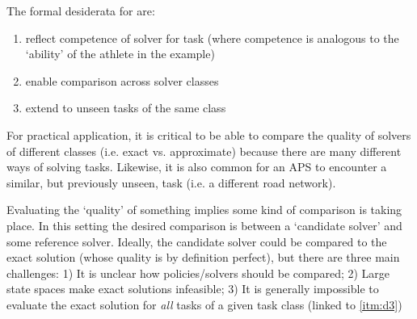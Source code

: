     The formal desiderata for \xQ{} are:
    
    \begin{enumerate}[label=\textbf{D\arabic*}]
        \item reflect competence of solver \solve{} for task \task{} (where competence is analogous to the `ability' of the athlete in the example)\label{itm:d1}
        \item enable comparison across solver classes \label{itm:d2}
        \item extend to unseen tasks of the same class \taskclass \label{itm:d3}
    \end{enumerate}
    
    For practical application, it is critical to be able to compare the quality of solvers of different classes (i.e. exact vs. approximate) because there are many different ways of solving tasks. Likewise, it is also common for an APS to encounter a similar, but previously unseen, task (i.e. a different road network).
    
    Evaluating the `quality' of something implies some kind of comparison is taking place. In this setting the desired comparison is between a `candidate solver' \solve{} and some reference solver. Ideally, the candidate solver could be compared to the exact solution (whose quality is by definition perfect), but there are three main challenges: 1) It is unclear how policies/solvers should be compared; 2) Large state spaces make exact solutions infeasible; 3) It is generally impossible to evaluate the exact solution for \emph{all} tasks of a given task class \taskclass{} (linked to \ref{itm:d3})
